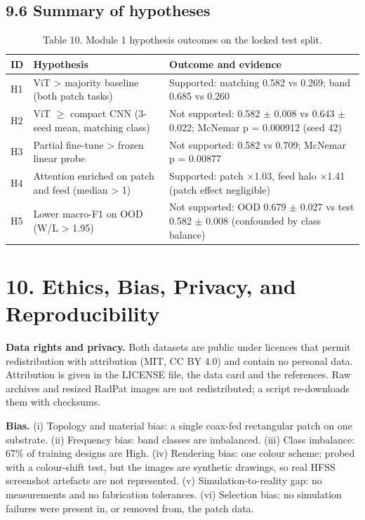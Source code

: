 \documentclass[11pt,a4paper]{article}
\begin{document}
\subsection*{9.6 Summary of hypotheses}
\begin{table}[H]\centering\small
\caption*{Table 10. Module 1 hypothesis outcomes on the locked test split.}
\begin{tabularx}{\linewidth}{XXX}
\toprule
\textbf{ID} & \textbf{Hypothesis} & \textbf{Outcome and evidence} \\
\midrule
H1 & ViT > majority baseline (both patch tasks) & Supported: matching 0.582 vs 0.269; band 0.685 vs 0.260 \\
H2 & ViT $\geq$ compact CNN (3-seed mean, matching class) & Not supported: 0.582 $\pm$ 0.008 vs 0.643 $\pm$ 0.022; McNemar p = 0.000912 (seed 42) \\
H3 & Partial fine-tune > frozen linear probe & Not supported: 0.582 vs 0.709; McNemar p = 0.00877 \\
H4 & Attention enriched on patch and feed (median > 1) & Supported: patch $\times$1.03, feed halo $\times$1.41 (patch effect negligible) \\
H5 & Lower macro-F1 on OOD (W/L > 1.95) & Not supported: OOD 0.679 $\pm$ 0.027 vs test 0.582 $\pm$ 0.008 (confounded by class balance) \\
\bottomrule
\end{tabularx}
\end{table}
\section*{10. Ethics, Bias, Privacy, and Reproducibility}
\textbf{Data rights and privacy.} Both datasets are public under licences that permit redistribution with attribution (MIT, CC BY 4.0) and contain no personal data. Attribution is given in the LICENSE file, the data card and the references. Raw archives and resized RadPat images are not redistributed; a script re-downloads them with checksums.

\textbf{Bias.} (i) Topology and material bias: a single coax-fed rectangular patch on one substrate. (ii) Frequency bias: band classes are imbalanced. (iii) Class imbalance: 67\% of training designs are High. (iv) Rendering bias: one colour scheme; probed with a colour-shift test, but the images are synthetic drawings, so real HFSS screenshot artefacts are not represented. (v) Simulation-to-reality gap: no measurements and no fabrication tolerances. (vi) Selection bias: no simulation failures were present in, or removed from, the patch data.
\end{document}
